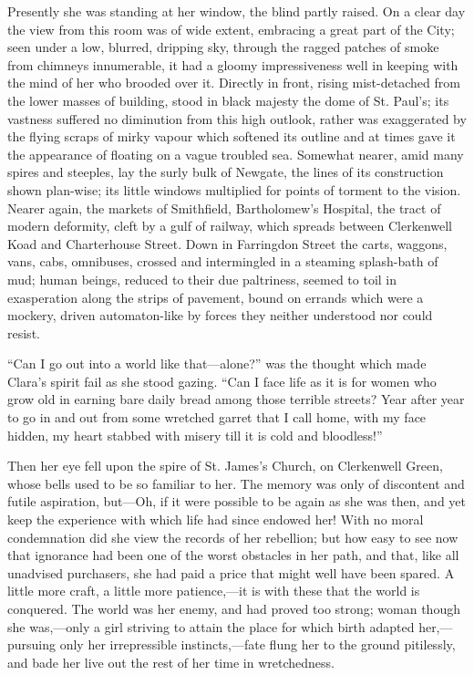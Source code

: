 Presently she was standing at her window, the blind partly raised. On a
clear day the view from this room was of wide extent, embracing a great
part of the City; seen under a low, blurred, dripping sky, through the
ragged patches of smoke from chimneys innumerable, it had a gloomy
impressiveness well in keeping with the mind of her who brooded over it.
Directly in front, rising mist-detached from the lower masses of
building, stood in black majesty the dome of St. Paul's; its vastness
suffered no diminution from this high outlook, rather was exaggerated by
the flying scraps of mirky vapour which softened its outline and at
times gave it the appearance of floating on a vague troubled sea.
Somewhat nearer, amid many spires and steeples, lay the surly bulk of
Newgate, the lines of its construction shown plan-wise; its {}little
windows multiplied for points of torment to the vision. Nearer again,
the markets of Smithfield, Bartholomew's Hospital, the tract of modern
deformity, cleft by a gulf of railway, which spreads between Clerkenwell
Koad and Charterhouse Street. Down in Farringdon Street the carts,
waggons, vans, cabs, omnibuses, crossed and intermingled in a steaming
splash-bath of mud; human beings, reduced to their due paltriness,
seemed to toil in exasperation along the strips of pavement, bound on
errands which were a mockery, driven automaton-like by forces they
neither understood nor could resist.

``Can I go out into a world like that---alone?'' was the thought which
made Clara's spirit fail as she stood gazing. ``Can I face life as it is
for women who grow old in earning bare daily bread among those terrible
streets? Year after year to go in and out from some wretched garret that
I call home, with my face hidden, my heart stabbed with misery till it
is cold and bloodless!''

Then her eye fell upon the spire of St. James's Church, on Clerkenwell
Green, whose bells used to be so familiar to her. The {}memory was only
of discontent and futile aspiration, but---Oh, if it were possible to be
again as she was then, and yet keep the experience with which life had
since endowed her! With no moral condemnation did she view the records
of her rebellion; but how easy to see now that ignorance had been one of
the worst obstacles in her path, and that, like all unadvised
purchasers, she had paid a price that might well have been spared. A
little more craft, a little more patience,---it is with these that the
world is conquered. The world was her enemy, and had proved too strong;
woman though she was,---only a girl striving to attain the place for
which birth adapted her,---pursuing only her irrepressible
instincts,---fate flung her to the ground pitilessly, and bade her live
out the rest of her time in wretchedness.

